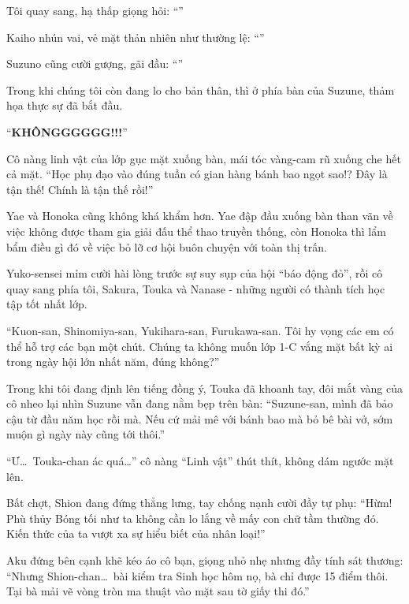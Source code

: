 \documentclass[../main.tex]{subfiles}
\begin{document}
Tôi quay sang, hạ thấp giọng hỏi: ``''

Kaiho nhún vai, vẻ mặt thản nhiên như thường lệ: ``''

Suzuno cũng cười gượng, gãi đầu: ``''

Trong khi chúng tôi còn đang lo cho bản thân, thì ở phía bàn của Suzune, thảm họa thực sự đã bắt đầu.

``{\Large\textbf{KHÔNGGGGGG!!!}}''

Cô nàng linh vật của lớp gục mặt xuống bàn, mái tóc vàng-cam rũ xuống che hết cả mặt. ``Học phụ đạo vào đúng tuần có gian hàng bánh bao ngọt sao!? Đây là tận thế! Chính là tận thế rồi!''

Yae và Honoka cũng không khá khẩm hơn. Yae đập đầu xuống bàn than vãn về việc không được tham gia giải đấu thể thao truyền thống, còn Honoka thì lẩm bẩm điều gì đó về việc bỏ lỡ cơ hội buôn chuyện với toàn thị trấn.

Yuko-sensei mỉm cười hài lòng trước sự suy sụp của hội ``báo động đỏ'', rồi cô quay sang phía tôi, Sakura, Touka và Nanase - những người có thành tích học tập tốt nhất lớp.

``Kuon-san, Shinomiya-san, Yukihara-san, Furukawa-san. Tôi hy vọng các em có thể hỗ trợ các bạn một chút. Chúng ta không muốn lớp 1-C vắng mặt bất kỳ ai trong ngày hội lớn nhất năm, đúng không?''

Trong khi tôi đang định lên tiếng đồng ý, Touka đã khoanh tay, đôi mắt vàng của cô nheo lại nhìn Suzune vẫn đang nằm bẹp trên bàn: ``Suzune-san, mình đã bảo cậu từ đầu năm học rồi mà. Nếu cứ mải mê với bánh bao mà bỏ bê bài vở, sớm muộn gì ngày này cũng tới thôi.''

``Ư\dots\ Touka-chan ác quá\dots'' cô nàng ``Linh vật'' thút thít, không dám ngước mặt lên.

Bất chợt, Shion đang đứng thẳng lưng, tay chống nạnh cười đầy tự phụ: ``Hừm! Phù thủy Bóng tối như ta không cần lo lắng về mấy con chữ tầm thường đó. Kiến thức của ta vượt xa sự hiểu biết của nhân loại!''

Aku đứng bên cạnh khẽ kéo áo cô bạn, giọng nhỏ nhẹ nhưng đầy tính sát thương: ``Nhưng Shion-chan\dots\ bài kiểm tra Sinh học hôm nọ, bà chỉ được 15 điểm thôi. Tại bà mải vẽ vòng tròn ma thuật vào mặt sau tờ giấy thi đó.''
\end{document}
